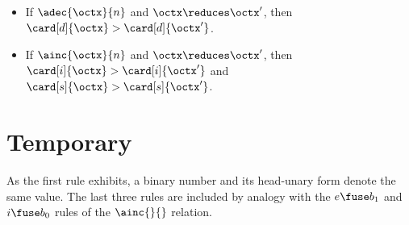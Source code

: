     \begin{itemize}
    \item If $\adec{\octx}{n}$ and $\octx \reduces \octx'$, then $\card[d]{\octx} > \card[d]{\octx'}$.
    \item If $\ainc{\octx}{n}$ and $\octx \reduces \octx'$, then $\card[i]{\octx} > \card[i]{\octx'}$ and $\card[s]{\octx} > \card[s]{\octx'}$.
    \end{itemize}



\section{Temporary}


As the first rule exhibits, a binary number and its head-unary form denote the same value.
The last three rules are included by analogy with the $e \fuse b_1$ and $i \fuse b_0$ rules of the $\ainc{}{}$ relation.

